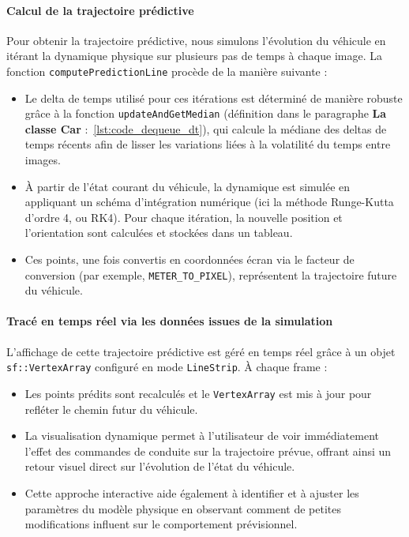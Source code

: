 \paragraph{Calcul de la trajectoire prédictive}
Pour obtenir la trajectoire prédictive, nous simulons l'évolution du véhicule en itérant la dynamique physique sur plusieurs pas de temps à chaque image.
La fonction \texttt{computePredictionLine} procède de la manière suivante :
\begin{itemize}
    \item Le delta de temps utilisé pour ces itérations est déterminé de manière robuste grâce à la fonction \texttt{updateAndGetMedian} (définition dans le paragraphe \textbf{La classe Car} :~\ref{lst:code_dequeue_dt}), qui calcule la médiane des deltas de temps récents afin de lisser les variations liées à la volatilité du temps entre images.
    \item À partir de l'état courant du véhicule, la dynamique est simulée en appliquant un schéma d'intégration numérique (ici la méthode Runge-Kutta d'ordre 4, ou RK4).
    Pour chaque itération, la nouvelle position et l'orientation sont calculées et stockées dans un tableau.
    \item Ces points, une fois convertis en coordonnées écran via le facteur de conversion (par exemple, \texttt{METER\_TO\_PIXEL}), représentent la trajectoire future du véhicule.
\end{itemize}

\paragraph{Tracé en temps réel via les données issues de la simulation}
L'affichage de cette trajectoire prédictive est géré en temps réel grâce à un objet \texttt{sf::VertexArray}\cite{sfml_sf_vertexarray} configuré en mode \texttt{LineStrip}.
À chaque frame :
\begin{itemize}
    \item Les points prédits sont recalculés et le \texttt{VertexArray} est mis à jour pour refléter le chemin futur du véhicule.
    \item La visualisation dynamique permet à l'utilisateur de voir immédiatement l'effet des commandes de conduite sur la trajectoire prévue, offrant ainsi un retour visuel direct sur l'évolution de l'état du véhicule.
    \item Cette approche interactive aide également à identifier et à ajuster les paramètres du modèle physique en observant comment de petites modifications influent sur le comportement prévisionnel.
\end{itemize}


